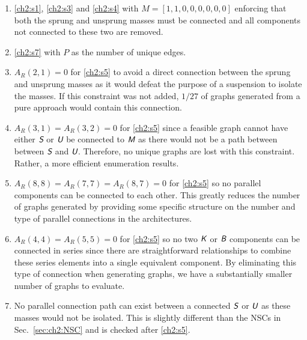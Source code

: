 \begin{enumerate}[label=$\bullet$, widest=$\bullet$, nosep]

\item \ref{ch2:s1}, \ref{ch2:s3} and \ref{ch2:s4} with $M = [1, 1, 0, 0, 0, 0, 0, 0]$ enforcing that both the sprung and unsprung masses must be connected and all components not connected to these two are removed.

\item \ref{ch2:s7} with $P$ as the number of unique edges.

\item $A_R(2,1) = 0$ for \ref{ch2:s5} to avoid a direct connection between the sprung and unsprung masses as it would defeat the purpose of a suspension to isolate the masses. If this constraint was not added, $1/27$ of graphs generated from a pure \mypm{} approach would contain this connection.

\item $A_R(3,1) = A_R(3,2) = 0$ for \ref{ch2:s5} since a feasible graph cannot have either $\textsl{\textsf{S}}$ or $\textsl{\textsf{U}}$ be connected to $\textsl{\textsf{M}}$ as there would not be a path between between $\textsl{\textsf{S}}$ and $\textsl{\textsf{U}}$. Therefore, no unique graphs are lost with this constraint. Rather, a more efficient enumeration results.

\item $A_R(8,8) = A_R(7,7) = A_R(8,7) = 0$ for \ref{ch2:s5} so no parallel components can be connected to each other. This greatly reduces the number of graphs generated by providing some specific structure on the number and type of parallel connections in the architectures.

\item $A_R(4,4) = A_R(5,5) = 0$ for \ref{ch2:s5} so no two $\textsl{\textsf{K}}$ or $\textsl{\textsf{B}}$ components can be connected in series since there are straightforward relationships to combine these series elements into a single equivalent component. By eliminating this type of connection when generating graphs, we have a substantially smaller number of graphs to evaluate.

\item No parallel connection path can exist between a connected $\textsl{\textsf{S}}$ or $\textsl{\textsf{U}}$ as these masses would not be isolated. This is slightly different than the NSCs in Sec.~\ref{sec:ch2:NSC} and is checked after \ref{ch2:s5}.


\end{enumerate}
